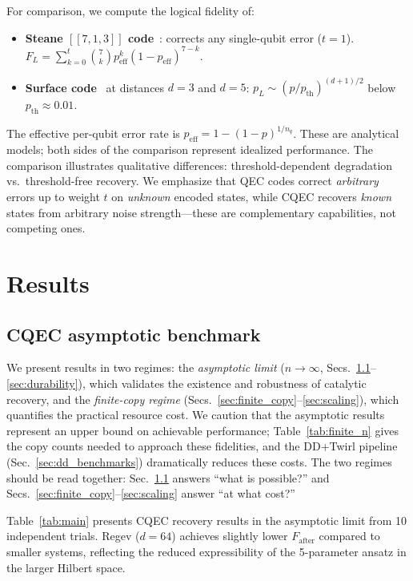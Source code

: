 \documentclass[prx,twocolumn,superscriptaddress,longbibliography,floatfix]{revtex4-2}
\begin{document}
For comparison, we compute the logical fidelity of:
\begin{itemize}
\item \textbf{Steane $[\![7,1,3]\!]$ code}~\cite{Steane1996}: corrects any single-qubit error ($t = 1$). $F_L = \sum_{k=0}^{t} \binom{7}{k} p_\mathrm{eff}^k (1-p_\mathrm{eff})^{7-k}$.
\item \textbf{Surface code}~\cite{Kitaev2003,Fowler2012} at distances $d = 3$ and $d = 5$: $p_L \sim (p/p_\mathrm{th})^{(d+1)/2}$ below $p_\mathrm{th} \approx 0.01$.
\end{itemize}
The effective per-qubit error rate is $p_\mathrm{eff} = 1 - (1-p)^{1/n_q}$.
These are analytical models; both sides of the comparison represent idealized performance.
The comparison illustrates qualitative differences: threshold-dependent degradation vs.\ threshold-free recovery.
We emphasize that QEC codes correct \emph{arbitrary} errors up to weight $t$ on \emph{unknown} encoded states, while CQEC recovers \emph{known} states from arbitrary noise strength---these are complementary capabilities, not competing ones.


\section{Results}
\label{sec:results}

\subsection{CQEC asymptotic benchmark}
\label{sec:main_results}

We present results in two regimes: the \emph{asymptotic limit} ($n \to \infty$, Secs.~\ref{sec:main_results}--\ref{sec:durability}), which validates the existence and robustness of catalytic recovery, and the \emph{finite-copy regime} (Secs.~\ref{sec:finite_copy}--\ref{sec:scaling}), which quantifies the practical resource cost.
We caution that the asymptotic results represent an upper bound on achievable performance; Table~\ref{tab:finite_n} gives the copy counts needed to approach these fidelities, and the DD+Twirl pipeline (Sec.~\ref{sec:dd_benchmarks}) dramatically reduces these costs.
The two regimes should be read together: Sec.~\ref{sec:main_results} answers ``what is possible?'' and Secs.~\ref{sec:finite_copy}--\ref{sec:scaling} answer ``at what cost?''

Table~\ref{tab:main} presents CQEC recovery results in the asymptotic limit from 10 independent trials.
Regev ($d = 64$) achieves slightly lower $F_\mathrm{after}$ compared to smaller systems, reflecting the reduced expressibility of the 5-parameter ansatz in the larger Hilbert space.
\end{document}
